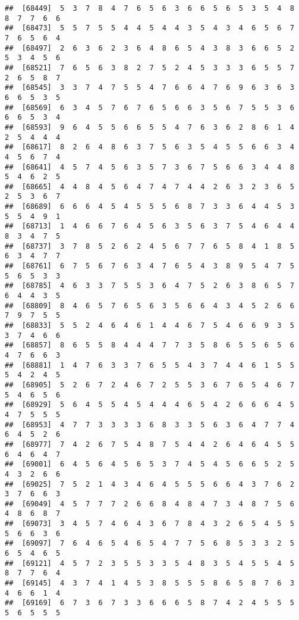 \documentclass[
]{book}
\begin{document}
\begin{verbatim}
##  [68449]  5  3  7  8  4  7  6  5  6  3  6  6  5  6  5  3  5  4  8  8  7  7  6  6
##  [68473]  5  5  7  5  5  4  4  5  4  4  3  5  4  3  4  6  5  6  7  7  6  5  6  4
##  [68497]  2  6  3  6  2  3  6  4  8  6  5  4  3  8  3  6  6  5  2  5  3  4  5  6
##  [68521]  7  6  5  6  3  8  2  7  5  2  4  5  3  3  3  6  5  5  7  2  6  5  8  7
##  [68545]  3  3  7  4  7  5  5  4  7  6  6  4  7  6  9  6  3  6  3  6  6  5  3  5
##  [68569]  6  3  4  5  7  6  7  6  5  6  6  3  5  6  7  5  5  3  6  6  6  5  3  4
##  [68593]  9  6  4  5  5  6  6  5  5  4  7  6  3  6  2  8  6  1  4  2  5  4  4  4
##  [68617]  8  2  6  4  8  6  3  7  5  6  3  5  4  5  5  6  6  3  4  4  5  6  7  4
##  [68641]  4  5  7  4  5  6  3  5  7  3  6  7  5  6  6  3  4  4  8  5  4  6  2  5
##  [68665]  4  4  8  4  5  6  4  7  4  7  4  4  2  6  3  2  3  6  5  2  5  3  6  7
##  [68689]  6  6  6  4  5  4  5  5  5  6  8  7  3  3  6  4  4  5  3  5  5  4  9  1
##  [68713]  1  4  6  6  7  6  4  5  6  3  5  6  3  7  5  4  6  4  4  8  3  4  7  5
##  [68737]  3  7  8  5  2  6  2  4  5  6  7  7  6  5  8  4  1  8  5  6  3  4  7  7
##  [68761]  6  7  5  6  7  6  3  4  7  6  5  4  3  8  9  5  4  7  5  5  6  5  3  3
##  [68785]  4  6  3  3  7  5  5  3  6  4  7  5  2  6  3  8  6  5  7  6  4  4  3  5
##  [68809]  8  4  6  5  7  6  5  6  3  5  6  6  4  3  4  5  2  6  6  7  9  7  5  5
##  [68833]  5  5  2  4  6  4  6  1  4  4  6  7  5  4  6  6  9  3  5  3  7  4  6  6
##  [68857]  8  6  5  5  8  4  4  4  7  7  3  5  8  6  5  5  6  5  6  4  7  6  6  3
##  [68881]  1  4  7  6  3  3  7  6  5  5  4  3  7  4  4  6  1  5  5  5  4  2  4  5
##  [68905]  5  2  6  7  2  4  6  7  2  5  5  3  6  7  6  5  4  6  7  5  4  6  5  6
##  [68929]  5  6  4  5  5  4  5  4  4  4  6  5  4  2  6  6  6  4  5  4  7  5  5  5
##  [68953]  4  7  7  3  3  3  3  6  8  3  3  5  6  3  6  4  7  7  4  6  4  5  2  6
##  [68977]  7  4  2  6  7  5  4  8  7  5  4  4  2  6  4  6  4  5  5  6  4  6  4  7
##  [69001]  6  4  5  6  4  5  6  5  3  7  4  5  4  5  6  6  5  2  5  4  3  2  6  6
##  [69025]  7  5  2  1  4  3  4  6  4  5  5  5  6  6  4  3  7  6  2  3  7  6  6  3
##  [69049]  4  5  7  7  7  2  6  6  8  4  8  4  7  3  4  8  7  5  6  4  8  6  8  7
##  [69073]  3  4  5  7  4  6  4  3  6  7  8  4  3  2  6  5  4  5  5  5  6  6  3  6
##  [69097]  7  6  4  6  5  4  6  5  4  7  7  5  6  8  5  3  3  2  5  6  5  4  6  5
##  [69121]  4  5  7  2  3  5  5  3  3  5  4  8  3  5  4  5  5  4  5  8  7  7  6  4
##  [69145]  4  3  7  4  1  4  5  3  8  5  5  5  8  6  5  8  7  6  3  4  6  6  1  4
##  [69169]  6  7  3  6  7  3  3  6  6  6  5  8  7  4  2  4  5  5  5  5  6  5  5  5

\end{verbatim}
\end{document}
